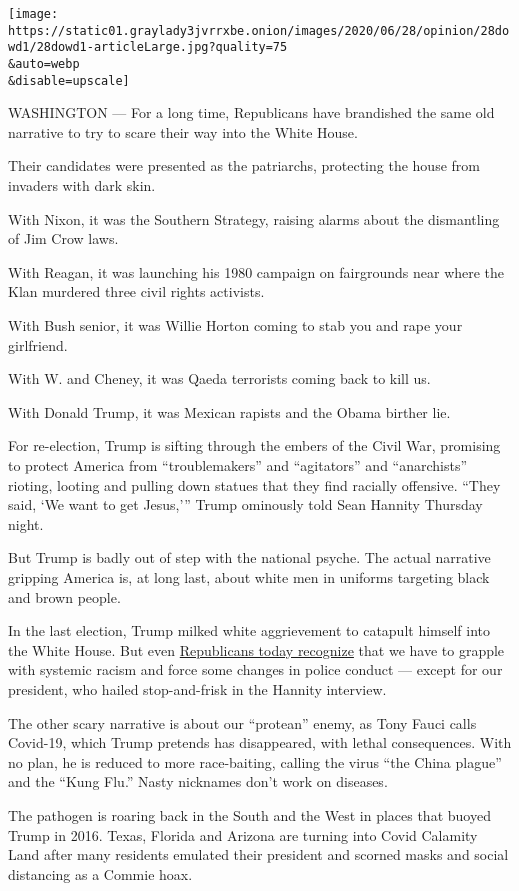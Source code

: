 \texttt{[image: https://static01.graylady3jvrrxbe.onion/images/2020/06/28/opinion/28dowd1/28dowd1-articleLarge.jpg?quality=75\\\&auto=webp\\\&disable=upscale]}

WASHINGTON --- For a long time, Republicans have brandished the same old
narrative to try to scare their way into the White House.

Their candidates were presented as the patriarchs, protecting the house
from invaders with dark skin.

With Nixon, it was the Southern Strategy, raising alarms about the
dismantling of Jim Crow laws.

With Reagan, it was launching his 1980 campaign on fairgrounds near
where the Klan murdered three civil rights activists.

With Bush senior, it was Willie Horton coming to stab you and rape your
girlfriend.

With W. and Cheney, it was Qaeda terrorists coming back to kill us.

With Donald Trump, it was Mexican rapists and the Obama birther lie.

For re-election, Trump is sifting through the embers of the Civil War,
promising to protect America from ``troublemakers'' and ``agitators''
and ``anarchists'' rioting, looting and pulling down statues that they
find racially offensive. ``They said, `We want to get Jesus,''' Trump
ominously told Sean Hannity Thursday night.

But Trump is badly out of step with the national psyche. The actual
narrative gripping America is, at long last, about white men in uniforms
targeting black and brown people.

In the last election, Trump milked white aggrievement to catapult
himself into the White House. But even
\href{https://www.nytimes3xbfgragh.onion/2020/06/11/us/politics/trump-on-race.html}{Republicans
today recognize} that we have to grapple with systemic racism and force
some changes in police conduct --- except for our president, who hailed
stop-and-frisk in the Hannity interview.

The other scary narrative is about our ``protean'' enemy, as Tony Fauci
calls Covid-19, which Trump pretends has disappeared, with lethal
consequences. With no plan, he is reduced to more race-baiting, calling
the virus ``the China plague'' and the ``Kung Flu.'' Nasty nicknames
don't work on diseases.

The pathogen is roaring back in the South and the West in places that
buoyed Trump in 2016. Texas, Florida and Arizona are turning into Covid
Calamity Land after many residents emulated their president and scorned
masks and social distancing as a Commie hoax.

